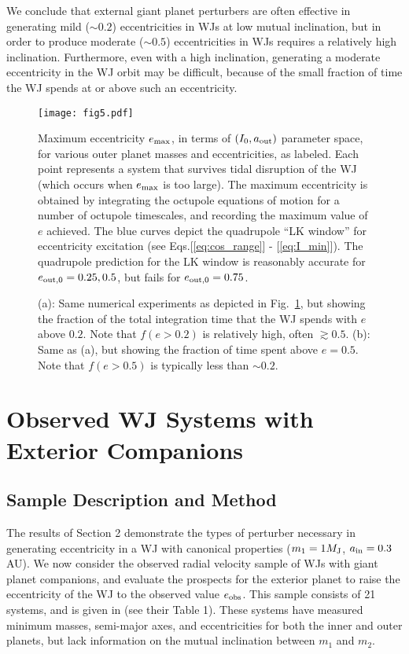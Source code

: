 \documentclass[12pt,useAMS, usenatbib]{mn2e}
\newcommand{\Max}{{\rm max}}
\newcommand{\In}{{\rm in}}
\newcommand{\Out}{{\rm out}}
\newcommand{\ain}{a_\In}
\newcommand{\aout}{a_\Out}
\newcommand{\emax}{e_\Max}
\newcommand{\eobs}{e_{\rm obs}}
\newcommand{\mjup}{M_{\rm J}}
\begin{document}
We conclude that external giant planet perturbers are often effective in generating mild ($\sim 0.2$) eccentricities in WJs at low mutual inclination, but in order to produce moderate ($\sim 0.5$) eccentricities in WJs requires a relatively high inclination.  Furthermore, even with a high inclination, generating a moderate eccentricity in the WJ orbit may be difficult, because of the small fraction of time the WJ spends at or above such an eccentricity.

\begin{figure*}
\centering 
\texttt{[image: fig5.pdf]}
\caption{Maximum eccentricity $\emax$, in terms of $(I_0,\aout)$ parameter space, for various outer planet masses and eccentricities, as labeled.  Each point represents a system that survives tidal disruption of the WJ (which occurs when $\emax$ is too large).  The maximum eccentricity is obtained by integrating the octupole equations of motion for a number of octupole timescales, and recording the maximum value of $e$ achieved.  The blue curves depict the quadrupole ``LK window'' for eccentricity excitation (see Eqs.[\ref{eq:cos_range}] - [\ref{eq:I_min}]).  The quadrupole prediction for the LK window is reasonably accurate for $e_{\Out,0} = 0.25, 0.5$, but fails for $e_{\Out,0}= 0.75$. }
\label{fig:emax_LK}
\end{figure*}

\begin{figure*}
\centering 
{} 

\caption{(a): Same numerical experiments as depicted in Fig.~\ref{fig:emax_LK}, but showing the fraction of the total integration time that the WJ spends with $e$ above $0.2$. Note that $f(e > 0.2)$ is relatively high, often $\gtrsim 0.5$.  (b): Same as (a), but showing the fraction of time spent above $e = 0.5$.  Note that $f(e > 0.5)$ is typically less than $\sim 0.2$.}
\label{fig:frac_LK}
\end{figure*}



\section{Observed WJ Systems with Exterior Companions}
\label{sec:observed}
\subsection{Sample Description and Method}
The results of Section 2 demonstrate the types of perturber necessary in generating eccentricity in a WJ with canonical properties ($m_1 = 1 \mjup$, $\ain = 0.3$ AU).  We now consider the observed radial velocity sample of WJs with giant planet companions, and evaluate the prospects for the exterior planet to raise the eccentricity of the WJ to the observed value $\eobs$.  This sample consists of 21 systems, and is given in \citealt{antonini2016} (see their Table 1).  These systems have measured minimum masses, semi-major axes, and eccentricities for both the inner and outer planets, but lack information on the mutual inclination between $m_1$ and $m_2$. 
\end{document}
